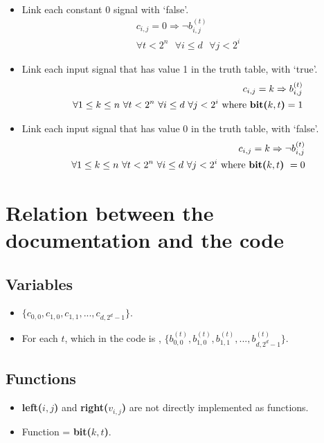 \documentclass[letterpaper,10pt]{article}
\begin{document}
\begin{itemize}
\begin{align*}
    \end{align*}
    \item Link each constant 0 signal with `false'.
    \begin{align*}
        c_{i,j} = 0 \Rightarrow \lnot b_{i,j}^{(t)} \\
        \forall t < 2^n\text{ }\forall i \leq d\text{ }\forall j < 2^i
    \end{align*}
    \item Link each input signal that has value 1 in the truth table, with `true'.
    \begin{align*}
        c_{i,j} = k \Rightarrow b_{i,j}^{(t)} \\
        \forall 1 \leq k \leq n\text{ }\forall t  < 2^n\text{ }\forall i \leq d\text{ }\forall j < 2^i\text{ where \textbf{bit($k,t$)}} = 1
    \end{align*}
    \item Link each input signal that has value 0 in the truth table, with `false'.
    \begin{align*}
        c_{i,j} = k \Rightarrow \lnot b_{i,j}^{(t)} \\
        \forall 1 \leq k \leq n\text{ }\forall t < 2^n\text{ }\forall i \leq d\text{ }\forall j < 2^i\text{ where \textbf{bit($k,t$)} }= 0
    \end{align*}
\end{itemize}

\section{Relation between the documentation and the code}
\subsection{Variables}
\begin{itemize}
    \item {}$\{c_{0,0},c_{1,0},c_{1,1},...,c_{d,2^d-1}\}$.
    \item For each $t$, which in the code is , $\{b_{0,0}^{(t)},b_{1,0}^{(t)},b_{1,1}^{(t)},...,b_{d,2^d-1}^{(t)}\}$.
\end{itemize}
\subsection{Functions}
\begin{itemize}
    \item \textbf{left{($i,j$)}} and \textbf{right($v_{i,j}$)} are not directly implemented as functions.
    \item Function  = \textbf{bit($k,t$)}.
\end{itemize}
\end{document}
